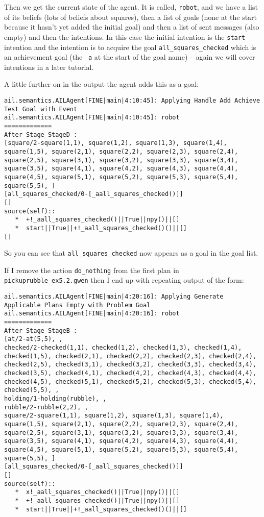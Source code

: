 \documentclass[a4]{article}
\begin{document}
Then we get the current state of the agent.  It is called, \texttt{robot}, and we have a list of its beliefs (lots of beliefs about squares), then a list of goals (none at the start because it hasn't yet added the initial goal) and then a list of sent messages (also empty) and then the intentions.  In this case the initial intention is the \texttt{start} intention and the intention is to acquire the goal \texttt{all\_squares\_checked} which is an achievement goal (the \texttt{\_a} at the start of the goal name) -- again we will cover intentions in a later tutorial.

A little further on in the output the agent adds this as a goal:
\begin{verbatim}
ail.semantics.AILAgent[FINE|main|4:10:45]: Applying Handle Add Achieve Test Goal with Event 
ail.semantics.AILAgent[FINE|main|4:10:45]: robot
=============
After Stage StageD :
[square/2-square(1,1), square(1,2), square(1,3), square(1,4), square(1,5), square(2,1), square(2,2), square(2,3), square(2,4), square(2,5), square(3,1), square(3,2), square(3,3), square(3,4), square(3,5), square(4,1), square(4,2), square(4,3), square(4,4), square(4,5), square(5,1), square(5,2), square(5,3), square(5,4), square(5,5), ]
[all_squares_checked/0-[_aall_squares_checked()]]
[]
source(self):: 
   *  +!_aall_squares_checked()||True||npy()||[]
   *  start||True||+!_aall_squares_checked()()||[]
[] 
\end{verbatim}
So you can see that \texttt{all\_squares\_checked} now appears as a goal in the goal list. 

If I remove the action \texttt{do\_nothing} from the first plan in \texttt{pickuprubble\_ex5.2.gwen} then I end up with repeating output of the form:

\begin{verbatim}
ail.semantics.AILAgent[FINE|main|4:20:16]: Applying Generate Applicable Plans Empty with Problem Goal 
ail.semantics.AILAgent[FINE|main|4:20:16]: robot
=============
After Stage StageB :
[at/2-at(5,5), , 
checked/2-checked(1,1), checked(1,2), checked(1,3), checked(1,4), checked(1,5), checked(2,1), checked(2,2), checked(2,3), checked(2,4), checked(2,5), checked(3,1), checked(3,2), checked(3,3), checked(3,4), checked(3,5), checked(4,1), checked(4,2), checked(4,3), checked(4,4), checked(4,5), checked(5,1), checked(5,2), checked(5,3), checked(5,4), checked(5,5), , 
holding/1-holding(rubble), , 
rubble/2-rubble(2,2), , 
square/2-square(1,1), square(1,2), square(1,3), square(1,4), square(1,5), square(2,1), square(2,2), square(2,3), square(2,4), square(2,5), square(3,1), square(3,2), square(3,3), square(3,4), square(3,5), square(4,1), square(4,2), square(4,3), square(4,4), square(4,5), square(5,1), square(5,2), square(5,3), square(5,4), square(5,5), ]
[all_squares_checked/0-[_aall_squares_checked()]]
[]
source(self):: 
   *  x!_aall_squares_checked()||True||npy()||[]
   *  +!_aall_squares_checked()||True||npy()||[]
   *  start||True||+!_aall_squares_checked()()||[]
\end{verbatim}
\end{document}
